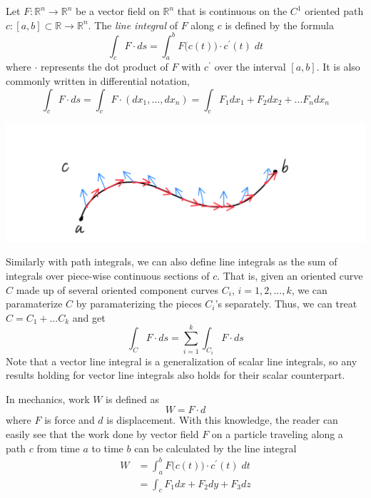   \begin{definition}
  Let $F: \mathbb{R}^n \longrightarrow \mathbb{R}^n$ be a vector field on $\mathbb{R}^n$ that is continuous on the $C^1$ oriented path $c: [a, b] \subset \mathbb{R} \longrightarrow \mathbb{R}^n$. The \textit{line integral} of $F$ along $c$ is defined by the formula 
  \[\int_c F \cdot d s = \int_a^b F\big( c(t)\big) \cdot c^\prime (t) \; d t\]
  where $\cdot$ represents the dot product of $F$ with $c^\prime$ over the interval $[a,b]$. It is also commonly written in differential notation, 
  \[\int_c F \cdot ds = \int_c F \cdot (dx_1, \ldots, d x_n) = \int_c F_1 dx_1 + F_2 dx_2 + \ldots F_n dx_n\]
  \begin{center}
      \includegraphics[scale=0.27]{img/Vector_Line_Integral.PNG}
  \end{center}
   Similarly with path integrals, we can also define line integrals as the sum of integrals over piece-wise continuous sections of $c$. That is, given an oriented curve $C$ made up of several oriented component curves $C_i$, $i = 1, 2, ..., k$, we can paramaterize $C$ by paramaterizing the pieces $C_i$'s separately. Thus, we can treat $C = C_1 + ... C_k$ and get
  \[\int_C F \cdot d s = \sum_{i = 1}^k \int_{C_i} F \cdot d s\]
  Note that a vector line integral is a generalization of scalar line integrals, so any results holding for vector line integrals also holds for their scalar counterpart. 
  \end{definition}

  \begin{example}[Work]
  In mechanics, work $W$ is defined as 
  \[W = F \cdot d\]
  where $F$ is force and $d$ is displacement. With this knowledge, the reader can easily see that the work done by vector field $F$ on a particle traveling along a path $c$ from time $a$ to time $b$ can be calculated by the line integral
  \begin{align*}
      W & = \int_a^b F\big( c(t)\big) \cdot c^\prime (t) \; d t \\
      & = \int_c F_1 dx + F_2 dy + F_3 dz
  \end{align*}
  \end{example}

